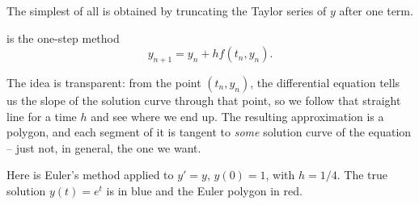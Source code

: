 The simplest of all is obtained by truncating the Taylor series of $y$ after one term.

\begin{definition}
   is the one-step method
  $$
  y_{n+1} = y_n + hf(t_n, y_n).
  $$
\end{definition}

The idea is transparent: from the point $(t_n, y_n)$, the differential equation tells us the slope of the solution curve through that point, so we follow that straight line for a time $h$ and see where we end up. The resulting approximation is a polygon, and each segment of it is tangent to \emph{some} solution curve of the equation -- just not, in general, the one we want.

Here is Euler's method applied to $y' = y$, $y(0) = 1$, with $h = 1/4$. The true solution $y(t) = e^t$ is in blue and the Euler polygon in red.
